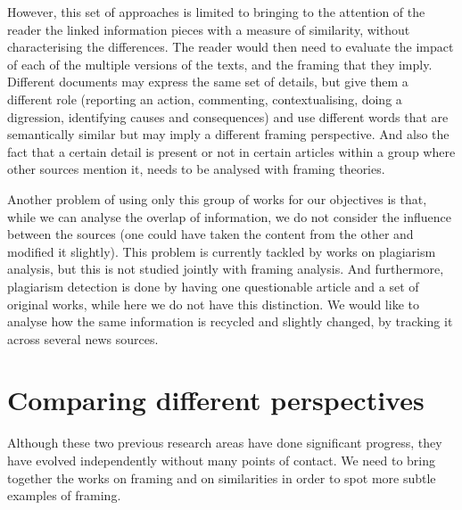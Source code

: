However, this set of approaches is limited to bringing to the attention of the reader the linked information pieces with a measure of similarity, without characterising the differences.
The reader would then need to evaluate the impact of each of the multiple versions of the texts, and the framing that they imply. 
Different documents may express the same set of details, but give them a different role (reporting an action, commenting, contextualising, doing a digression, identifying causes and consequences) and use different words that are semantically similar but may imply a different framing perspective.
And also the fact that a certain detail is present or not in certain articles within a group where other sources mention it, needs to be analysed with framing theories.


Another problem of using only this group of works for our objectives is that, while we can analyse the overlap of information, we do not consider the influence between the sources (one could have taken the content from the other and modified it slightly).
This problem is currently tackled by works on plagiarism analysis, but this is not studied jointly with framing analysis.
And furthermore, plagiarism detection is done by having one questionable article and a set of original works, while here we do not have this distinction.
We would like to analyse how the same information is recycled and slightly changed, by tracking it across several news sources.




\section{Comparing different perspectives}
\label{sec:lit_gap}
Although these two previous research areas have done significant progress, they have evolved independently without many points of contact.
We need to bring together the works on framing and on similarities in order to spot more subtle examples of framing.

